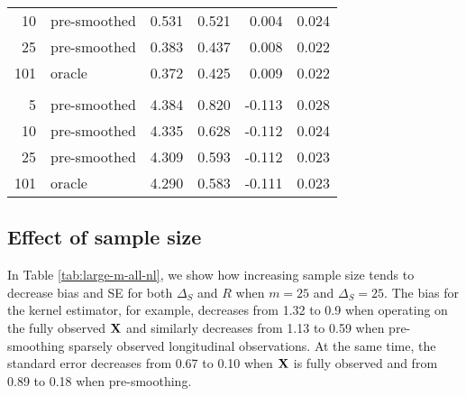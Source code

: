 \documentclass[useAMS,usenatbib,referee]{biom}
\begin{document}
\begin{table}[t]
\begin{tabular}{rlrrrr}
\hspace{1em}10 & pre-smoothed & 0.531 & 0.521 & 0.004 & 0.024\\
\hspace{1em}25 & pre-smoothed & 0.383 & 0.437 & 0.008 & 0.022\\
\hspace{1em}101 & oracle & 0.372 & 0.425 & 0.009 & 0.022\\
\addlinespace[0.3em]
\multicolumn{6}{l}{\textbf{Linear-unsmoothed}}\\
\hspace{1em}5 & pre-smoothed & 4.384 & 0.820 & -0.113 & 0.028\\
\hspace{1em}10 & pre-smoothed & 4.335 & 0.628 & -0.112 & 0.024\\
\hspace{1em}25 & pre-smoothed & 4.309 & 0.593 & -0.112 & 0.023\\
\hspace{1em}101 & oracle & 4.290 & 0.583 & -0.111 & 0.023\\
\bottomrule
\end{tabular}
\end{table}

\subsection{Effect of sample size} 
In Table \ref{tab:large-m-all-nl}, we show how increasing sample size tends to decrease bias and SE for both $\Delta_S$ and $R$ when $m = 25$ and $\Delta_S = 25$. The bias for the kernel estimator, for example, decreases from 1.32 to 0.9 when operating on the fully observed ${\bf X}$ and similarly decreases from 1.13 to 0.59 when pre-smoothing sparsely observed longitudinal observations. At the same time, the standard error decreases from 0.67 to 0.10 when ${\bf X}$ is fully observed and from 0.89 to 0.18 when pre-smoothing. 
\end{document}
